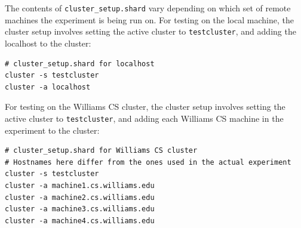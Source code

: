 \documentclass[twoside]{report}
\begin{document}
The contents of \texttt{cluster\_setup.shard} vary depending on which set of remote machines the experiment is being run on.
For testing on the local machine, the cluster setup involves setting the active cluster to \texttt{testcluster}, and adding the localhost to the cluster:

\begin{minipage}[c]{\textwidth-15pt}
  \begin{lstlisting}[language=Shard]
# cluster_setup.shard for localhost
cluster -s testcluster
cluster -a localhost
\end{lstlisting}
  \smallskip
\end{minipage}

For testing on the Williams CS cluster, the cluster setup involves setting the active cluster to \texttt{testcluster}, and adding each Williams CS machine in the experiment to the cluster:

\begin{minipage}[c]{\textwidth-15pt}
  \begin{lstlisting}[language=Shard]
# cluster_setup.shard for Williams CS cluster
# Hostnames here differ from the ones used in the actual experiment
cluster -s testcluster
cluster -a machine1.cs.williams.edu
cluster -a machine2.cs.williams.edu
cluster -a machine3.cs.williams.edu
cluster -a machine4.cs.williams.edu
\end{lstlisting}
  \smallskip
\end{minipage}


\end{document}
